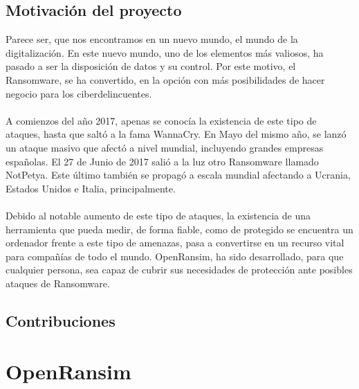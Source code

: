 \documentclass[a4paper,12pt]{article}
\begin{document}




\subsection{Motivación del proyecto}
Parece ser, que nos encontramos en un nuevo mundo, el mundo de la digitalización. En este nuevo mundo, uno de los elementos más valiosos, ha pasado a ser la disposición de datos y su control. Por este motivo, el Ransomware, se ha convertido, en la opción con más posibilidades de hacer negocio para los ciberdelincuentes.\\\\
A comienzos del año 2017, apenas se conocía la existencia de este tipo de ataques, hasta que saltó a la fama WannaCry. En Mayo del mismo año, se lanzó un ataque masivo que afectó a nivel mundial, incluyendo grandes empresas españolas. El 27 de Junio de 2017 salió a la luz otro Ransomware llamado NotPetya. Este último también se propagó a escala mundial afectando a Ucrania, Estados Unidos e Italia, principalmente.\\\\
Debido al notable aumento de este tipo de ataques, la existencia de una herramienta que pueda medir, de forma fiable, como de protegido se encuentra un ordenador frente a este tipo de amenazas, pasa a convertirse en un recurso vital para compañías de todo el mundo. 
OpenRansim, ha sido desarrollado, para que cualquier persona, sea capaz de cubrir sus necesidades de protección ante posibles ataques de Ransomware. 

\subsection{Contribuciones}

\section{OpenRansim}
\end{document}
